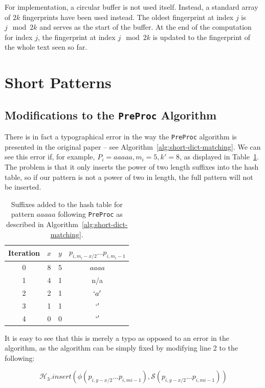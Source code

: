 \documentclass[ %
                    author={Dominic Joseph Moylett},
                    degree={MEng},
                     title={Dictionary Matching with Fingerprints},
                  subtitle={An Empirical Analysis},
                      type={research},
                      year={2015} ]{dissertation}
\begin{document}
For implementation, a circular buffer is not used itself. Instead, a standard array of $2k$ fingerprints have been used instead. The oldest fingerprint at index $j$ is $j \mod 2k$ and serves as the start of the buffer. At the end of the computation for index $j$, the fingerprint at index $j \mod 2k$ is updated to the fingerprint of the whole text seen so far.

\section{Short Patterns}
\label{sec:impl-short}

\subsection{Modifications to the \texttt{PreProc} Algorithm}

There is in fact a typographical error in the way the \texttt{PreProc} algorithm is presented in the original paper -- see Algorithm~\ref{alg:short-dict-matching}. We can see this error if, for example, $P_i = aaaaa, m_i = 5, k' = 8$, as displayed in Table~\ref{tab:preproc-results-incorrect}. The problem is that it only inserts the power of two length suffixes into the hash table, so if our pattern is not a power of two in length, the full pattern will not be inserted.

\begin{table}[t]
  \centering
  \begin{tabular}{|c|c|c|c|}
    \hline
    Iteration & $x$ & $y$ & $p_{i, m_i-x/2}...p_{i, m_i - 1}$ \\\hline
    0 & 8 & 5 & $aaaa$ \\\hline
    1 & 4 & 1 & n/a \\\hline
    2 & 2 & 1 & $`a'$ \\\hline
    3 & 1 & 1 & $`'$ \\\hline
    4 & 0 & 0 & $`'$ \\\hline
  \end{tabular}
  \caption{Suffixes added to the hash table for pattern $aaaaa$ following \texttt{PreProc} as described in Algorithm~\ref{alg:short-dict-matching}.}
  \label{tab:preproc-results-incorrect}
\end{table}

It is easy to see that this is merely a typo as opposed to an error in the algorithm, as the algorithm can be simply fixed by modifying line 2 to the following:

$$\mathcal{H}_3.insert(\phi(p_{i, y - x/2}...p_{i, m{i} - 1}), \mathcal{S}(p_{i, y - x/2}...p_{i, m{i} - 1}))$$
\end{document}
